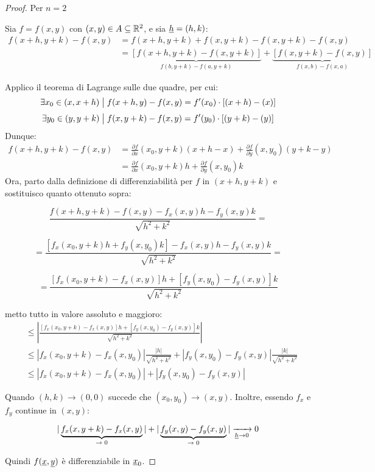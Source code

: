 \begin{proof}
    Per \(n=2\)

    Sia \(f = f(x,y)\) con \((x,y) \in A \subseteq \mathbb{R}^{2}\), e sia \(\underline{h} = (h,k)\):
    \begin{align*}
        f(x+h,y+k) - f(x,y) & = f(x+h,y+k) + f(x,y+k) - f(x,y+k) - f(x,y)                                                                        \\
                            & = \underbrace{[f(x+h,y+k) - f(x,y+k) ]}_{f(b,y+k) - f(a,y+k)} + \underbrace{[f(x,y+k) - f(x,y)]}_{f(x,b) - f(x,a)}
    \end{align*}

    Applico il teorema di Lagrange sulle due quadre, per cui:
    \[
        \exists x_0 \in (x,x+h) \;\big|\; f(x+h,y)-f(x,y) = f'(x_0) \cdot [(x+h)-(x)]
    \]
    \[
        \exists y_0 \in (y,y+k) \;\big|\; f(x,y+k)-f(x,y) = f'(y_0) \cdot [(y+k)-(y)]
    \]
    Dunque:
    \begin{align*}
        f(x+h,y+k) - f(x,y) & = \frac{\partial f}{\partial x}(x_0,y+k) (x +h -x) + \frac{\partial f}{\partial y}(x,y_0) ( y + k -y) \\
                            & = \frac{\partial f}{\partial x}(x_0,y+k) h + \frac{\partial f}{\partial y}(x,y_0)k
    \end{align*}
    Ora, parto dalla definizione di differenziabilità per \(f\) in \((x+h,y+k)\) e sostituisco quanto ottenuto sopra:

    \[
        \frac{f(x+h,y+k) - f(x,y) - f_x(x,y)h - f_y(x,y) k}{\sqrt{h^{2}+k^{2}}} =
    \]

    \[
        = \frac{\left[ f_x(x_0,y+k) h + f_y(x,y_0) k \right] -f_x(x,y)h -f_y(x,y)k}{\sqrt{h^{2}+k^{2}}} =
    \]

    \[
        = \frac{[f_x(x_0,y+k) - f_x(x,y)] h + [f_y(x,y_0) - f_y(x,y)] k}{\sqrt{h^{2}+k^{2}}}
    \]

    metto tutto in valore assoluto e maggioro:
    \begin{align*}
        [\ldots] & \le \left|\frac{[f_x(x_0,y+k) - f_x(x,y)] h + [f_y(x,y_0) - f_y(x,y)] k}{\sqrt{h^{2}+k^{2}}}\right|                      \\
                 & \le |f_x(x_0,y+k) - f_x(x,y_0)| \frac{|h|}{\sqrt{h^{2}+k^{2}}} + | f_y(x,y_0) - f_y(x,y)| \frac{|k|}{\sqrt{h^{2}+k^{2}}} \\
                 & \le  |f_x(x_0,y+k) - f_x(x,y_0) | + |f_y(x,y_0) - f_y(x,y) |
    \end{align*}

    \filbreak{}
    Quando \((h,k) \rightarrow (0,0)\) succede che \((x_0,y_0) \rightarrow (x,y)\). Inoltre, essendo \(f_x\) e \(f_y\) continue in \((x,y)\):

    \[
        |\underbrace{f_x(x,y+k) - f_x(x,y)}_\text{\(\rightarrow 0\)} | + |\underbrace{f_y(x,y) - f_y(x,y)}_\text{\(\rightarrow 0\)} | \xrightarrow[\underline{h} \to 0]{} 0
    \]

    Quindi \(f(\underline{x},\underline{y})\) è differenziabile in \(\underline{x}_0\).

\end{proof}

